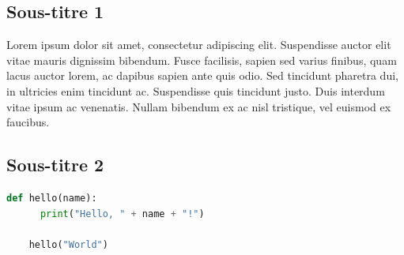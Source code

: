 \documentclass[12pt, a4paper, oneside]{Thesis}
\begin{document}
\subsection{Sous-titre 1}


Lorem ipsum dolor sit amet, consectetur adipiscing elit. Suspendisse auctor elit vitae mauris dignissim bibendum. Fusce facilisis, sapien sed varius finibus, quam lacus auctor lorem, ac dapibus sapien ante quis odio. Sed tincidunt pharetra dui, in ultricies enim tincidunt ac. Suspendisse quis tincidunt justo. Duis interdum vitae ipsum ac venenatis. Nullam bibendum ex ac nisl tristique, vel euismod ex faucibus.\\

\subsection{Sous-titre 2}

\begin{lstlisting}[language=Python, caption={Exemple de code Python}, label=mon-code-python]
	def hello(name):
	  print("Hello, " + name + "!")
	
	hello("World")
\end{lstlisting}
\end{document}
